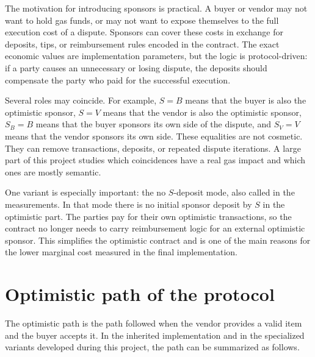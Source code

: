 The motivation for introducing sponsors is practical. A buyer or vendor may not want to hold
gas funds, or may not want to expose themselves to the full execution cost of a dispute.
Sponsors can cover these costs in exchange for deposits, tips, or reimbursement rules
encoded in the contract. The exact economic values are implementation parameters, but the
logic is protocol-driven: if a party causes an unnecessary or losing dispute, the deposits
should compensate the party who paid for the successful execution.

Several roles may coincide. For example, \(S=B\) means that the buyer is also the optimistic
sponsor, \(S=V\) means that the vendor is also the optimistic sponsor, \(S_B=B\) means that
the buyer sponsors its own side of the dispute, and \(S_V=V\) means that the vendor sponsors
its own side. These equalities are not cosmetic. They can remove transactions, deposits, or
repeated dispute iterations. A large part of this project studies which coincidences have a
real gas impact and which ones are mostly semantic.

One variant is especially important: the no \(S\)-deposit mode, also called \simsox{} in the
measurements. In that mode there is no initial sponsor deposit by \(S\) in the optimistic
part. The parties pay for their own optimistic transactions, so the contract no longer needs
to carry reimbursement logic for an external optimistic sponsor. This simplifies the
optimistic contract and is one of the main reasons for the lower marginal cost measured in
the final implementation.

\section{Optimistic path of the protocol}

The optimistic path is the path followed when the vendor provides a valid item and the buyer
accepts it. In the inherited implementation and in the specialized variants developed during
this project, the path can be summarized as follows.

